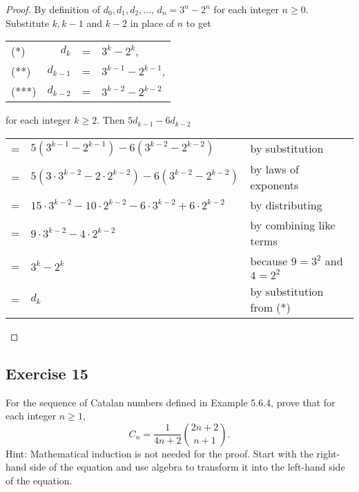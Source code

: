 \documentclass[14pt]{extarticle}
\newcommand{\cy}{\color{cyan}}
\begin{document}
\begin{proof}
    By definition of $d_0, d_1, d_2, \ldots$, $d_n = 3^n - 2^n$ for each integer $n \geq 0$. Substitute $k, k-1$ and $k-2$ in place of $n$ to get

    \begin{tabular}{lrcl}
        (*)   & $d_k$       & = & $3^k - 2^k$,         \\
        (**)  & $d_{k - 1}$ & = & $3^{k-1} - 2^{k-1}$, \\
        (***) & $d_{k - 2}$ & = & $3^{k-2} - 2^{k-2}$
    \end{tabular}

    for each integer $k \geq 2$. Then $5d_{k-1} - 6d_{k-2}$

    \begin{tabular}{lll}
        = & $5(3^{k-1} - 2^{k-1}) - 6(3^{k-2} - 2^{k-2})$                             & {\cy by substitution}                 \\
        = & $5(3 \cdot 3^{k-2} - 2 \cdot 2^{k-2}) - 6(3^{k-2} - 2^{k-2})$             & {\cy by laws of exponents}            \\
        = & $15 \cdot 3^{k-2} - 10 \cdot 2^{k-2} - 6 \cdot 3^{k-2} + 6 \cdot 2^{k-2}$ & {\cy by distributing}                 \\
        = & $9 \cdot 3^{k-2} - 4 \cdot 2^{k-2}$                                       & {\cy by combining like terms}         \\
        = & $3^{k} - 2^{k}$                                                           & {\cy because $9 = 3^2$ and $4 = 2^2$} \\
        = & $d_k$                                                                     & {\cy by substitution from (*)}        \\
    \end{tabular}
\end{proof}

\subsection{Exercise 15}
For the sequence of Catalan numbers defined in Example 5.6.4, prove that for each integer $n \geq 1$,
\[
    C_n = \frac{1}{4n+2}\binom{2n+2}{n+1}.
\]
Hint: Mathematical induction is not needed for the
proof. Start with the right-hand side of the equation and
use algebra to transform it into the left-hand side of the
equation.
\end{document}
